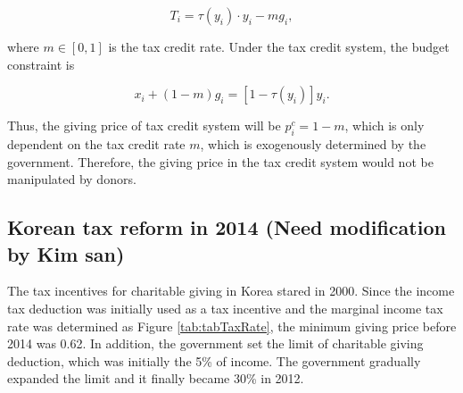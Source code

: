 \documentclass[ review  , 3p ]{elsarticle}
\begin{document}
  \[
      T_i = \tau(y_i)\cdot y_i - m g_i,
  \]
  
  where \(m \in [0, 1]\) is the tax credit rate. Under the tax credit system, the budget constraint is
  
  \[
      x_i + (1 - m) g_i = [1 - \tau(y_i)] y_i.
  \]
  
  Thus, the giving price of tax credit system will be \(p_i^c = 1 - m\), which is only dependent on the tax credit rate \(m\), which is exogenously determined by the government.
  Therefore, the giving price in the tax credit system would not be manipulated by donors.
  
  \hypertarget{korean-tax-reform-in-2014-need-modification-by-kim-san}{%
  \subsection{Korean tax reform in 2014 (Need modification by Kim san)}\label{korean-tax-reform-in-2014-need-modification-by-kim-san}}
  
  The tax incentives for charitable giving in Korea stared in 2000. Since the income tax deduction was initially used as a tax incentive and the marginal income tax rate was determined as Figure \ref{tab:tabTaxRate}, the minimum giving price before 2014 was 0.62. In addition, the government set the limit of charitable giving deduction, which was initially the 5\% of income. The government gradually expanded the limit and it finally became 30\% in 2012.
  
\end{document}
